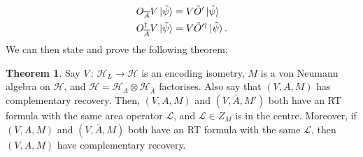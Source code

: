 \documentclass[12pt,a4paper]{report}
\numberwithin{equation}{section}
\newcommand{\ol}[1]{\overline{#1}}
\theoremstyle{definition}
\theoremstyle{theorem}
\newtheorem{theorem}{Theorem}[section]
\theoremstyle{theorem}
\theoremstyle{example}
\theoremstyle{definition}
\begin{document}
\begin{equation}
	\begin{aligned}
		O_{\ol{A}}V\ket{\tilde{\psi}}&=V\tilde{O}'\ket{\tilde{\psi}}\\
		O_{\ol{A}}^{\dagger}V\ket{\tilde{\psi}}&=V\tilde{O}'^{\dagger}\ket{\tilde{\psi}}.
	\end{aligned}
\end{equation}
We can then state and prove the following theorem:
\begin{theorem}
	Say $V\,:\,\mathcal{H}_{L}\to\mathcal{H}$ is an encoding isometry, $M$ is a von Neumann algebra on $\mathcal{H}$, and $\mathcal{H}=\mathcal{H}_{A}\otimes\mathcal{H}_{\ol{A}}$ factorises. Also say that $(V,A,M)$ has complementary recovery. Then, $(V,A,M)$ and $(V,\ol{A},M')$ both have an RT formula with the same area operator $\mathcal{L}$, and $\mathcal{L}\in Z_{M}$ is in the centre. Moreover, if $(V,A,M)$ and $(V,\ol{A},M)$ both have an RT formula with the same $\mathcal{L}$, then $(V,A,M)$ have complementary recovery.
\end{theorem}
\end{document}

